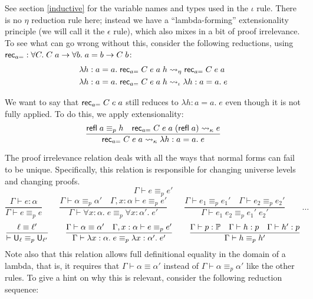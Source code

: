 See section \ref{inductive} for the variable names and types used in the $\iota$ rule. There is no $\eta$ reduction rule here; instead we have a ``lambda-forming'' extensionality principle (we will call it the $\epsilon$ rule), which also mixes in a bit of proof irrelevance. To see what can go wrong without this, consider the following reductions, using $\mathsf{rec}_{a=}:\forall C.\;C\;a\to \forall b.\;a=b\to C\;b$:
\begin{align*}
&\lambda h:a=a.\;\mathsf{rec}_{a=}\;C\;e\;a\;h\rightsquigarrow_\eta\mathsf{rec}_{a=}\;C\;e\;a\\
&\lambda h:a=a.\;\mathsf{rec}_{a=}\;C\;e\;a\;h\rightsquigarrow_\iota\lambda h:a=a.\;e
\end{align*}

We want to say that $\mathsf{rec}_{a=}\;C\;e\;a$ still reduces to $\lambda h:a=a.\;e$ even though it is not fully applied. To do this, we apply extensionality:
$$\frac{\mathsf{refl}\;a\equiv_p h\quad\mathsf{rec}_{a=}\;C\;e\;a\;(\mathsf{refl}\;a)\rightsquigarrow_\kappa e}{\mathsf{rec}_{a=}\;C\;e\;a\rightsquigarrow_\kappa \lambda h:a=a.\;e}$$


The proof irrelevance relation deals with all the ways that normal forms can fail to be unique. Specifically, this relation is responsible for changing universe levels and changing proofs.
$$\boxed{\Gamma\vdash e\equiv_p e'}$$
$$\frac{\Gamma\vdash e:\alpha}{\Gamma\vdash e\equiv_p e}\qquad
\frac{\Gamma\vdash\alpha\equiv_p\alpha'\quad \Gamma,x:\alpha\vdash e\equiv_p e'}{\Gamma\vdash \forall x:\alpha.\;e\equiv_p \forall x:\alpha'.\;e'}\qquad
\frac{\Gamma\vdash e_1\equiv_p e_1'\quad \Gamma\vdash e_2\equiv_p e_2'}{\Gamma\vdash e_1\;e_2\equiv_p e_1'\;e_2'}\qquad\dots$$
$$\frac{\ell\equiv\ell'}{\vdash \U_\ell\equiv_p\U_{\ell'}}\qquad
\frac{\Gamma\vdash\alpha\equiv\alpha'\quad \Gamma,x:\alpha\vdash e\equiv_p e'}{\Gamma\vdash \lambda x:\alpha.\;e\equiv_p \lambda x:\alpha'.\;e'}\qquad
\frac{\Gamma\vdash p:\P\quad \Gamma\vdash h:p\quad \Gamma\vdash h':p}{\Gamma \vdash h\equiv_p h'}$$
Note also that this relation allows full definitional equality in the domain of a lambda, that is, it requires that $\Gamma\vdash \alpha\equiv\alpha'$ instead of $\Gamma\vdash \alpha\equiv_p\alpha'$ like the other rules. To give a hint on why this is relevant, consider the following reduction sequence:


